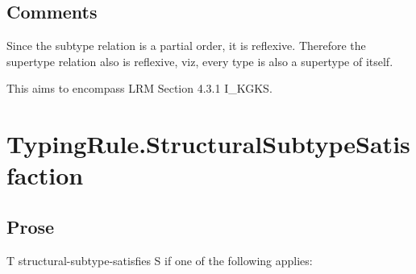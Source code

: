 \documentclass{book}
\begin{document}
\subsection{Comments}
  Since the subtype relation is a partial order, it is reflexive. Therefore the
  supertype relation also is reflexive, viz, every type is also a supertype of
  itself.

  This aims to encompass LRM Section 4.3.1 I\_KGKS.

\section{TypingRule.StructuralSubtypeSatisfaction}

\subsection{Prose}
  T structural-subtype-satisfies S if one of the following applies:
\end{document}
